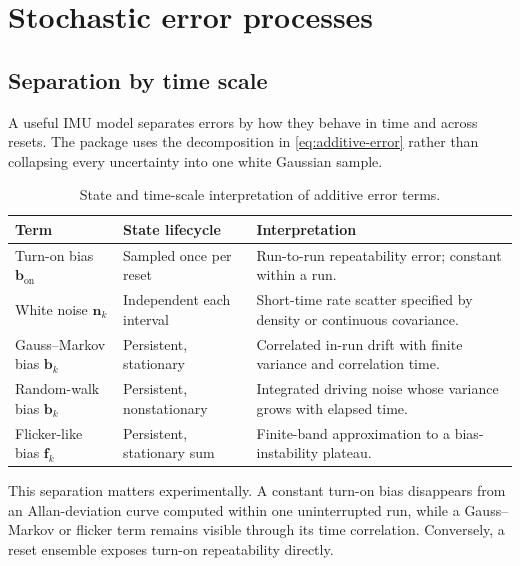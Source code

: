 \documentclass[11pt,oneside,headings=big]{scrreprt}
\newcommand{\vect}[1]{\bm{#1}}
\begin{document}
    \chapter{Stochastic error processes}
    \label{chap:stochastic}


    \section{Separation by time scale}
    A useful IMU model separates errors by how they behave in time and across
    resets. The package uses the decomposition in \cref{eq:additive-error} rather
    than collapsing every uncertainty into one white Gaussian sample.

    \begin{table}[htbp]
        \centering
        \caption{State and time-scale interpretation of additive error terms.}
        \label{tab:stochastic-terms}
        \begin{tabularx}{\textwidth}{@{}L{1.55in}L{1.5in}Y@{}}
\toprule
\textbf{Term} & \textbf{State lifecycle} & \textbf{Interpretation} \\
\midrule
Turn-on bias $\vect b_{\mathrm{on}}$ & Sampled once per reset & Run-to-run repeatability error; constant within a run. \\
White noise $\vect n_k$ & Independent each interval & Short-time rate scatter specified by density or continuous covariance. \\
Gauss--Markov bias $\vect b_k$ & Persistent, stationary & Correlated in-run drift with finite variance and correlation time. \\
Random-walk bias $\vect b_k$ & Persistent, nonstationary & Integrated driving noise whose variance grows with elapsed time. \\
Flicker-like bias $\vect f_k$ & Persistent, stationary sum & Finite-band approximation to a bias-instability plateau. \\
\bottomrule
        \end{tabularx}
    \end{table}

    This separation matters experimentally. A constant turn-on bias disappears from
    an Allan-deviation curve computed within one uninterrupted run, while a
    Gauss--Markov or flicker term remains visible through its time correlation.
    Conversely, a reset ensemble exposes turn-on repeatability directly.
\end{document}
